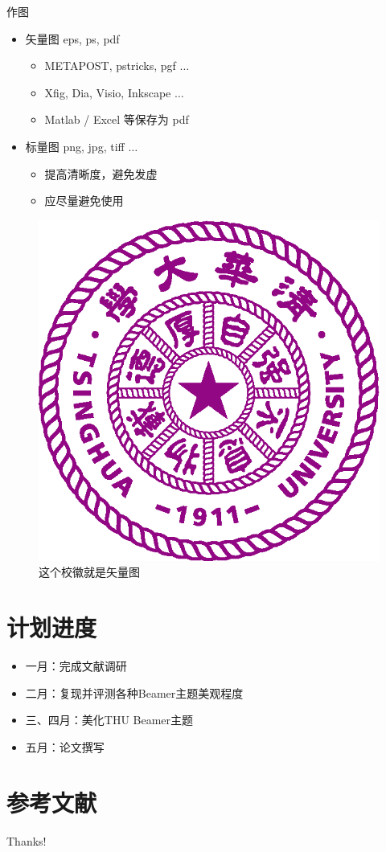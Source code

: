 \documentclass{beamer}
\begin{document}
\begin{frame}{作图}
	\begin{itemize}
	\item 矢量图 eps, ps, pdf
		\begin{itemize}
		\item METAPOST, pstricks, pgf $\ldots$
		\item Xfig, Dia, Visio, Inkscape $\ldots$
		\item Matlab / Excel 等保存为 pdf
		\end{itemize}
	\item 标量图 png, jpg, tiff $\ldots$
		\begin{itemize}
			\item 提高清晰度，避免发虚
			\item 应尽量避免使用
		\end{itemize}
	\end{itemize}
	\begin{figure}[htpb]
		\centering
		\includegraphics[width=0.2\linewidth]{pic/Tsinghua_University_Logo.eps}
		\caption{这个校徽就是矢量图}
	\end{figure}
\end{frame}

\section{计划进度}
\begin{frame}
	\begin{itemize}
\item 一月：完成文献调研
\item 二月：复现并评测各种Beamer主题美观程度
\item 三、四月：美化THU Beamer主题
\item 五月：论文撰写
	\end{itemize}
\end{frame}

\section{参考文献}

\begin{frame}[allowframebreaks]


\end{frame}

\begin{frame}
\begin{center}
{\Huge\calligra Thanks!}
\end{center}
\end{frame}
\end{document}
